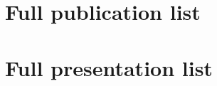 
\pagebreak
\section{Full publication list}\vspace{0.2cm} 



\pagebreak
\section{Full presentation list}\vspace{0.2cm} 




